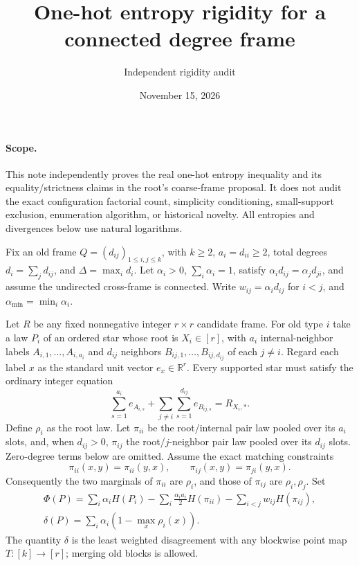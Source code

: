 \documentclass[11pt]{article}
\title{One-hot entropy rigidity for a connected degree frame}
\author{Independent rigidity audit}
\date{November 15, 2026}
\begin{document}
\maketitle

\paragraph{Scope.}
This note independently proves the real one-hot entropy inequality and its
equality/strictness claims in the root's coarse-frame proposal. It does not
audit the exact configuration factorial count, simplicity conditioning,
small-support exclusion, enumeration algorithm, or historical novelty.
All entropies and divergences below use natural logarithms.

Fix an old frame $Q=(d_{ij})_{1\leq i,j\leq k}$, with $k\geq2$,
$a_i=d_{ii}\geq2$, total degrees $d_i=\sum_jd_{ij}$, and
$\Delta=\max_i d_i$. Let $\alpha_i>0$, $\sum_i\alpha_i=1$, satisfy
$\alpha_i d_{ij}=\alpha_jd_{ji}$, and assume the undirected cross-frame
is connected. Write $w_{ij}=\alpha_i d_{ij}$ for $i<j$, and
$\alpha_{\min}=\min_i\alpha_i$.

Let $R$ be any fixed nonnegative integer $r\times r$ candidate frame.
For old type $i$ take a law $P_i$ of an ordered star whose root is
$X_i\in[r]$, with $a_i$ internal-neighbor labels $A_{i,1},\ldots,A_{i,a_i}$
and $d_{ij}$ neighbors $B_{ij,1},\ldots,B_{ij,d_{ij}}$ of each $j\ne i$.
Regard each label $x$ as the standard unit vector $e_x\in\mathbb R^r$.
Every supported star must satisfy the ordinary integer equation
\begin{equation}
 \sum_{s=1}^{a_i}e_{A_{i,s}}+
 \sum_{j\ne i}\sum_{s=1}^{d_{ij}}e_{B_{ij,s}}
 =R_{X_i,*}.
 \label{constraint}
\end{equation}
Define $\rho_i$ as the root law. Let $\pi_{ii}$ be the root/internal pair
law pooled over its $a_i$ slots, and, when $d_{ij}>0$, $\pi_{ij}$ the
root/$j$-neighbor pair law pooled over its $d_{ij}$ slots. Zero-degree
terms below are omitted. Assume the exact matching constraints
\[
 \pi_{ii}(x,y)=\pi_{ii}(y,x),\qquad
 \pi_{ij}(x,y)=\pi_{ji}(y,x).
\]
Consequently the two marginals of $\pi_{ii}$ are $\rho_i$, and those of
$\pi_{ij}$ are $\rho_i,\rho_j$. Set
\begin{equation}
\begin{gathered}
 \Phi(P)=\sum_i\alpha_iH(P_i)
 -\sum_i\frac{\alpha_i a_i}{2}H(\pi_{ii})
 -\sum_{i<j}w_{ij}H(\pi_{ij}),\\
 \delta(P)=\sum_i\alpha_i\left(1-\max_x\rho_i(x)\right).
\end{gathered}
 \label{functional}
\end{equation}
The quantity $\delta$ is the least weighted disagreement with any
blockwise point map $T:[k]\to[r]$; merging old blocks is allowed.
\end{document}
